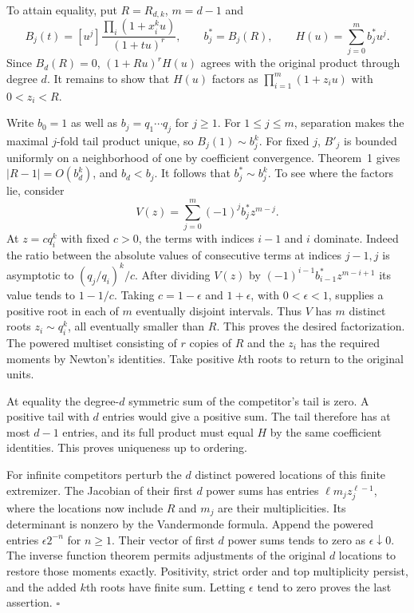 \documentclass[11pt]{article}
\begin{document}
To attain equality, put $R=R_{d,k}$, $m=d-1$ and
\[
 B_j(t)=[u^j]\frac{\prod_i(1+x_i^ku)}{(1+tu)^r},
 \qquad b_j^*=B_j(R),\qquad H(u)=\sum_{j=0}^{m}b_j^*u^j.
\]
Since $B_d(R)=0$, $(1+Ru)^rH(u)$ agrees with the original product through
degree $d$. It remains to show that $H(u)$ factors as
$\prod_{i=1}^m(1+z_i u)$ with $0<z_i<R$.

Write $b_0=1$ as well as $b_j=q_1\cdots q_j$ for $j\ge1$. For
$1\le j\le m$, separation makes the maximal $j$-fold tail product unique,
so $B_j(1)\sim b_j^k$. For fixed $j$, $B'_j$ is bounded uniformly on a
neighborhood of one by coefficient convergence. Theorem~1 gives
$|R-1|=O(b_d^k)$, and $b_d<b_j$. It follows that $b_j^*\sim b_j^k$.
To see where the factors lie, consider
\[
      V(z)=\sum_{j=0}^m(-1)^j b_j^* z^{m-j}.
\]
At $z=c q_i^k$ with fixed $c>0$, the terms with indices $i-1$ and $i$
dominate. Indeed the ratio between the absolute values of consecutive terms
at indices $j-1,j$ is asymptotic to $(q_j/q_i)^k/c$. After dividing $V(z)$
by $(-1)^{i-1}b_{i-1}^*z^{m-i+1}$ its value tends to $1-1/c$.
Taking $c=1-\epsilon$ and $1+\epsilon$, with $0<\epsilon<1$, supplies a
positive root in each of $m$ eventually disjoint intervals. Thus $V$ has $m$
distinct roots $z_i\sim q_i^k$, all eventually smaller than $R$.
This proves the desired factorization. The powered multiset consisting of
$r$ copies of $R$ and the $z_i$ has the required moments by Newton's
identities. Take positive $k$th roots to return to the original units.

At equality the degree-$d$ symmetric sum of the competitor's tail is zero.
A positive tail with $d$ entries would give a positive sum. The tail
therefore has at most $d-1$ entries, and its full product must equal $H$
by the same coefficient identities. This proves uniqueness up to ordering.

For infinite competitors perturb the $d$ distinct powered locations of this
finite extremizer. The Jacobian of their first $d$ power sums has entries
$\ell m_j z_j^{\ell-1}$, where the locations now include $R$ and $m_j$ are
their multiplicities. Its determinant is nonzero by the Vandermonde formula.
Append the powered entries $\epsilon 2^{-n}$ for $n\ge1$. Their vector of
first $d$ power sums tends to zero as $\epsilon\downarrow0$. The inverse
function theorem permits adjustments of the original $d$ locations to restore
those moments exactly. Positivity, strict order and top multiplicity persist,
and the added $k$th roots have finite sum. Letting $\epsilon$ tend to zero
proves the last assertion. \hfill$\square$
\end{document}
